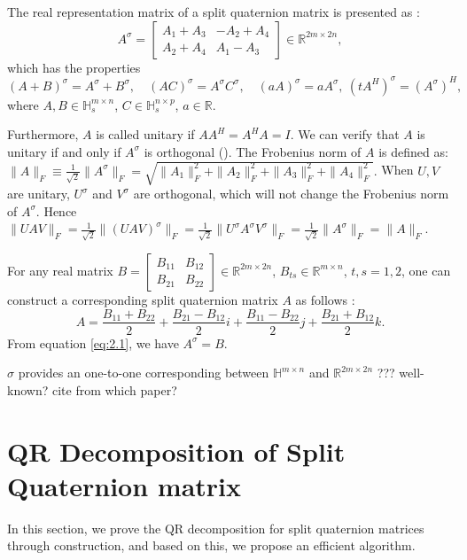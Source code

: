 \documentclass[preprint,12pt]{elsarticle}
\numberwithin{equation}{section}
\begin{document}
The real representation matrix of a split quaternion matrix is presented as \cite{TJiang2015}:
\begin{equation}
{A}^\sigma = \begin{bmatrix} A_1 + A_3 & -A_2 + A_4 \\ A_2 + A_4 & A_1 - A_3 \end{bmatrix} \in \mathbb{R}^{2m \times 2n},\label{eq:2.1}
\end{equation}
which has the properties
\begin{equation}
    ({A} + {B})^\sigma = {A}^\sigma + {B}^\sigma, \quad ({A}{C})^\sigma = {A}^\sigma {C}^\sigma, \quad (a {A})^\sigma = a {A}^\sigma, \ (t{A}^H)^\sigma = ({A}^\sigma)^H\label{eq:2.1.1},
\end{equation}
where ${A}, {B} \in \mathbb{H}_s^{m \times n}$, ${C} \in \mathbb{H}_s^{n \times p}$, $a \in \mathbb{R}$.

Furthermore,  \({A}\) is called unitary if \({A}{A}^H = {A}^H {A} = I\). We can verify that \(A\) is unitary if and only if  \({A}^\sigma\) is  orthogonal (\cite{TJiang2018}).
 The Frobenius norm of \({A}\) is defined as: $ \| {A} \|_F \equiv \frac{1}{\sqrt{2}} \| {A}^\sigma \|_F = \sqrt{\| A_1 \|_F^2 + \| A_2 \|_F^2 + \| A_3 \|_F^2 + \| A_4 \|_F^2}.$ When ${U}, {V}$ are unitary, ${U}^\sigma$ and ${V}^\sigma$ are orthogonal, which will not change the Frobenius norm  of $A^\sigma$. Hence
$\|{U}{A}{V}\|_F = \frac{1}{\sqrt{2}} \|({U}{A}{V})^\sigma\|_F 
= \frac{1}{\sqrt{2}} \|{U}^\sigma {A}^\sigma {V}^\sigma\|_F
=\frac{1}{\sqrt{2}} \|{A}^\sigma\|_F
= \|{A}\|_F.$

For any real matrix $B = \begin{bmatrix} B_{11} & B_{12} \\ B_{21} & B_{22} \end{bmatrix} \in \mathbb{R}^{2m \times 2n}$, $B_{ts} \in \mathbb{R}^{m \times n}$, $t, s = 1, 2$, one can construct a corresponding split quaternion matrix \(A\) as follows \cite{TJiang2015}:
\begin{equation}
{A} = \frac{B_{11} + B_{22}}{2} + \frac{B_{21} - B_{12}}{2}i + \frac{B_{11} - B_{22}}{2}j + \frac{B_{21} + B_{12}}{2}k.\label{eq:2.2}
\end{equation}
From equation \eqref{eq:2.1}, we have ${A}^\sigma = B$. 

{\color{red} $\sigma$ provides an one-to-one corresponding between $\mathbb{H}^{m\times n}$ and $\mathbb{R}^{2m \times 2n}$ ??? well-known? cite from which paper? }

\section{QR Decomposition of Split Quaternion matrix}
In this section, we prove the QR decomposition for split quaternion matrices through construction, and based on this, we propose an efficient algorithm.
\end{document}
